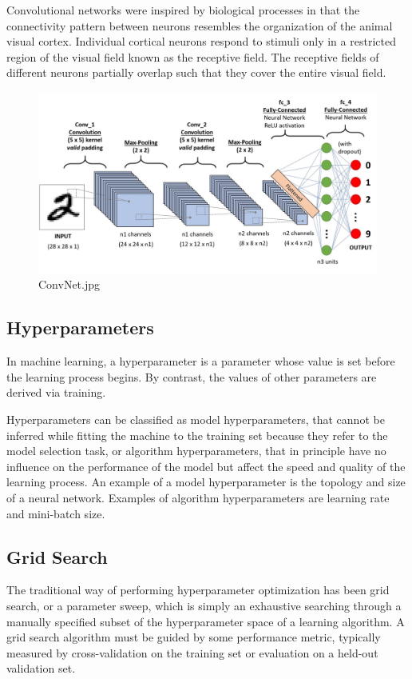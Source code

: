 Convolutional networks were inspired by biological processes in that the connectivity pattern between neurons resembles the organization of the animal visual cortex. Individual cortical neurons respond to stimuli only in a restricted region of the visual field known as the receptive field. The receptive fields of different neurons partially overlap such that they cover the entire visual field.
\begin{figure}[htpb]
\centering
\includegraphics[width=\textwidth,height=\textheight,keepaspectratio]{../../static/ConvNet.jpg}
\caption{ConvNet.jpg}
\end{figure}
\subsection{Hyperparameters}

In machine learning, a hyperparameter is a parameter whose value is set before the learning process begins. By contrast, the values of other parameters are derived via training.

Hyperparameters can be classified as model hyperparameters, that cannot be inferred while fitting the machine to the training set because they refer to the model selection task, or algorithm hyperparameters, that in principle have no influence on the performance of the model but affect the speed and quality of the learning process. An example of a model hyperparameter is the topology and size of a neural network. Examples of algorithm hyperparameters are learning rate and mini-batch size.


\subsection{Grid Search}

The traditional way of performing hyperparameter optimization has been grid search, or a parameter sweep, which is simply an exhaustive searching through a manually specified subset of the hyperparameter space of a learning algorithm. A grid search algorithm must be guided by some performance metric, typically measured by cross-validation on the training set or evaluation on a held-out validation set.

